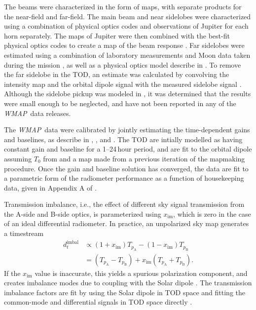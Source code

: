 \documentclass[twocolumn]{../../common/aa}
\def\WMAP{\emph{WMAP}}
\newcommand{\A}[0]{\mathrm{A}}
\newcommand{\B}[0]{\mathrm{B}}
\begin{document}
The beams were characterized in the form of maps, with separate products for the near-field and far-field. The main beam and near sidelobes were characterized using a combination of physical optics codes and observations of Jupiter for each horn separately. The maps of Jupiter were then combined with the best-fit physical optics codes to create a map of the beam response \citep{hill2009,weiland2010,bennett2012}.
Far sidelobes were estimated using a combination of laboratory measurements and Moon data taken during the mission \citep{barnes2003}, as well as a physical optics model describe in \citet{hinshaw2009}. To remove the far sidelobe  in the TOD, an estimate was calculated by convolving the intensity map and the orbital dipole signal with the measured sidelobe signal \citep{jarosik2007}. Although the sidelobe pickup was modeled in \citet{barnes2003}, it was determined that the results were small enough to be neglected, and have not been reported in any of the \WMAP\ data releases.

The \WMAP\ data were calibrated by jointly estimating the time-dependent gains and baselines, as describe in \citet{hinshaw2007}, \citet{hinshaw2009}, and \citet{jarosik2010}.
The TOD are intially modelled as having
constant gain and baseline for a 1--24\,hour period, and are fit to the orbital
dipole assuming $T_0$ from \citet{mather:1999} and a map made from a previous
iteration of the mapmaking procedure. Once the gain and baseline solution has
converged, the data are fit to a parametric form of the radiometer performance
as a function of housekeeping data, given in Appendix A of \citet{wmapexsupp}.

Transmission imbalance, i.e., the effect of different sky signal transmission from the A-side and B-side optics, is parameterized using $x_\mathrm{im}$, which is zero in the case of an ideal differential radiometer. In practice, an unpolarized sky map generates a timestream
\begin{align}
	d_t^\mathrm{imbal}&\propto (1+x_\mathrm{im})T_{p_\A}-(1-x_\mathrm{im})T_{p_\B}
	\\
	&=(T_{p_\A}-T_{p_\B})+x_\mathrm{im}(T_{p_\A}+T_{p_\B}).
\end{align}
If the $x_\mathrm{im}$ value is inaccurate, this yields a spurious polarization component, and creates imbalance modes due to coupling with the Solar dipole \citep{jarosik2007}. The transmission imbalance factors are fit by using the Solar dipole in TOD space and fitting the common-mode and differential signals in TOD space directly \citep{jarosik2003a,jarosik2007}.
\end{document}
